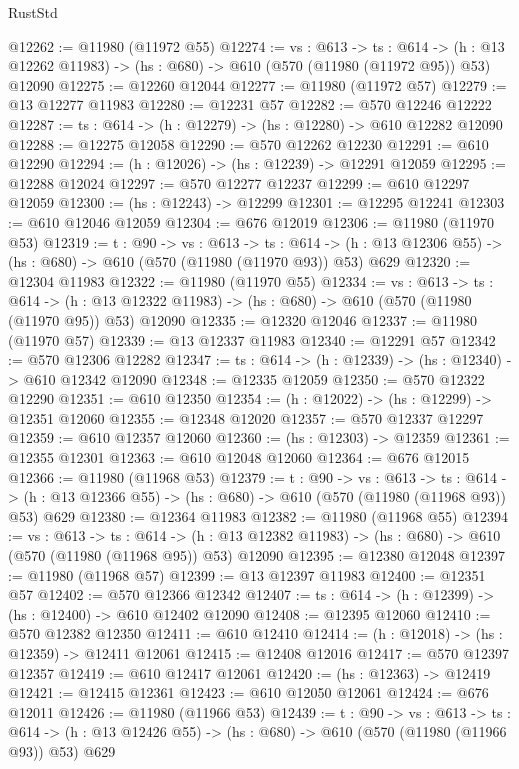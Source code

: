 \begin{lexlean}{RustStd}
\begin{coremodule}
@12262 := @11980 (@11972 @55)
@12274 := {vs : @613} ->
  {ts : @614} ->
  (h : @13 @12262 @11983) -> (hs : @680) -> @610 (@570 (@11980 (@11972 @95)) @53) @12090
@12275 := @12260 @12044
@12277 := @11980 (@11972 @57)
@12279 := @13 @12277 @11983
@12280 := @12231 @57
@12282 := @570 @12246 @12222
@12287 := {ts : @614} -> (h : @12279) -> (hs : @12280) -> @610 @12282 @12090
@12288 := @12275 @12058
@12290 := @570 @12262 @12230
@12291 := @610 @12290
@12294 := (h : @12026) -> (hs : @12239) -> @12291 @12059
@12295 := @12288 @12024
@12297 := @570 @12277 @12237
@12299 := @610 @12297 @12059
@12300 := (hs : @12243) -> @12299
@12301 := @12295 @12241
@12303 := @610 @12046 @12059
@12304 := @676 @12019
@12306 := @11980 (@11970 @53)
@12319 := {t : @90} ->
  {vs : @613} ->
  {ts : @614} -> (h : @13 @12306 @55) -> (hs : @680) -> @610 (@570 (@11980 (@11970 @93)) @53) @629
@12320 := @12304 @11983
@12322 := @11980 (@11970 @55)
@12334 := {vs : @613} ->
  {ts : @614} ->
  (h : @13 @12322 @11983) -> (hs : @680) -> @610 (@570 (@11980 (@11970 @95)) @53) @12090
@12335 := @12320 @12046
@12337 := @11980 (@11970 @57)
@12339 := @13 @12337 @11983
@12340 := @12291 @57
@12342 := @570 @12306 @12282
@12347 := {ts : @614} -> (h : @12339) -> (hs : @12340) -> @610 @12342 @12090
@12348 := @12335 @12059
@12350 := @570 @12322 @12290
@12351 := @610 @12350
@12354 := (h : @12022) -> (hs : @12299) -> @12351 @12060
@12355 := @12348 @12020
@12357 := @570 @12337 @12297
@12359 := @610 @12357 @12060
@12360 := (hs : @12303) -> @12359
@12361 := @12355 @12301
@12363 := @610 @12048 @12060
@12364 := @676 @12015
@12366 := @11980 (@11968 @53)
@12379 := {t : @90} ->
  {vs : @613} ->
  {ts : @614} -> (h : @13 @12366 @55) -> (hs : @680) -> @610 (@570 (@11980 (@11968 @93)) @53) @629
@12380 := @12364 @11983
@12382 := @11980 (@11968 @55)
@12394 := {vs : @613} ->
  {ts : @614} ->
  (h : @13 @12382 @11983) -> (hs : @680) -> @610 (@570 (@11980 (@11968 @95)) @53) @12090
@12395 := @12380 @12048
@12397 := @11980 (@11968 @57)
@12399 := @13 @12397 @11983
@12400 := @12351 @57
@12402 := @570 @12366 @12342
@12407 := {ts : @614} -> (h : @12399) -> (hs : @12400) -> @610 @12402 @12090
@12408 := @12395 @12060
@12410 := @570 @12382 @12350
@12411 := @610 @12410
@12414 := (h : @12018) -> (hs : @12359) -> @12411 @12061
@12415 := @12408 @12016
@12417 := @570 @12397 @12357
@12419 := @610 @12417 @12061
@12420 := (hs : @12363) -> @12419
@12421 := @12415 @12361
@12423 := @610 @12050 @12061
@12424 := @676 @12011
@12426 := @11980 (@11966 @53)
@12439 := {t : @90} ->
  {vs : @613} ->
  {ts : @614} -> (h : @13 @12426 @55) -> (hs : @680) -> @610 (@570 (@11980 (@11966 @93)) @53) @629

\end{coremodule}
\end{lexlean}
